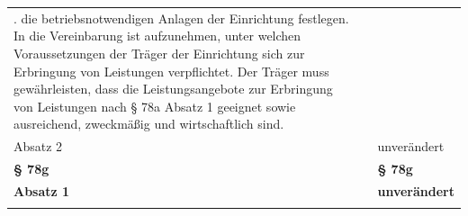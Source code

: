 \documentclass[10pt,a4paper,landscape]{article}
\begin{document}
\begin{longtable}{|L{8.2cm}|L{8.2cm}|L{8.2cm}|}
. die betriebsnotwendigen Anlagen der  \newline Einrichtung   \newline festlegen. In die Vereinbarung ist  \newline aufzunehmen, unter welchen  \newline Voraussetzungen der Träger der  \newline Einrichtung sich zur Erbringung von  \newline Leistungen verpflichtet. Der Träger muss  \newline gewährleisten, dass die Leistungsangebote  \newline zur Erbringung von Leistungen nach \S{} 78a  \newline Absatz 1 geeignet sowie ausreichend,  \newline zweckmäßig und wirtschaftlich sind. \\
\hhline{|---|}
Absatz 2 &  & unverändert \\
\hhline{|---|}
\textbf{\S{} 78g} &  & \textbf{\S{} 78g} \\
\hhline{|---|}
\textbf{Absatz 1} &  & \textbf{unverändert} \\
\hhline{|---|}

\end{longtable}
\end{document}
